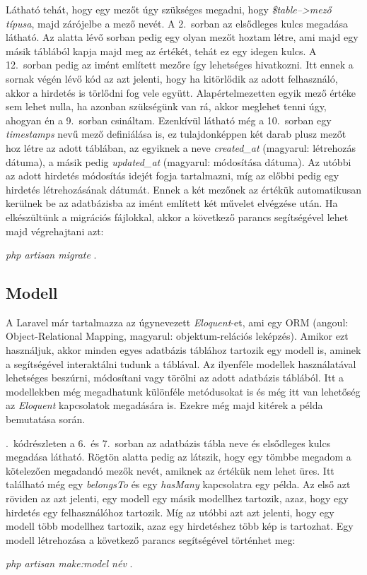 \documentclass[]{thesis-ekf}
\theoremstyle{definition}
\theoremstyle{remark}
\begin{document}
		Látható tehát, hogy egy mezőt úgy szükséges megadni, hogy \emph{\$table-->mező típusa}, majd zárójelbe a mező nevét. A 2.~sorban az elsődleges kulcs megadása látható. Az alatta lévő sorban pedig egy olyan mezőt hoztam létre, ami majd egy másik táblából kapja majd meg az értékét, tehát ez egy idegen kulcs. A 12.~sorban pedig az imént említett mezőre így lehetséges hivatkozni. Itt ennek a sornak végén lévő kód az azt jelenti, hogy ha kitörlődik az adott felhasználó, akkor a hirdetés is törlődni fog vele együtt. Alapértelmezetten egyik mező értéke sem lehet nulla, ha azonban szükségünk van rá, akkor meglehet tenni úgy, ahogyan én a 9.~sorban csináltam. Ezenkívül látható még a 10.~sorban egy \emph{timestamps} nevű mező definiálása is, ez tulajdonképpen két darab plusz mezőt hoz létre az adott táblában, az egyiknek a neve \emph{created\_at} (magyarul: létrehozás dátuma), a másik pedig \emph{updated\_at} (magyarul: módosítása dátuma). Az utóbbi az adott hirdetés módosítás idejét fogja tartalmazni, míg az előbbi pedig egy hirdetés létrehozásának dátumát. Ennek a két mezőnek az értékük automatikusan kerülnek be az adatbázisba az imént említett két művelet elvégzése után. Ha elkészültünk a migrációs fájlokkal, akkor a következő parancs segítségével lehet majd végrehajtani azt:
		\begin{center}
			\emph{php artisan migrate} .
		\end{center}
	\subsection{Modell}
		A Laravel már tartalmazza az úgynevezett \emph{Eloquent}-et, ami egy ORM (angoul: Object-Relational Mapping, magyarul: objektum-relációs leképzés). Amikor ezt használjuk, akkor minden egyes adatbázis táblához tartozik egy modell is, aminek a segítségével interaktálni tudunk a táblával. Az ilyenféle modellek használatával lehetséges beszúrni, módosítani vagy törölni az adott adatbázis táblából. Itt a modellekben még megadhatunk különféle metódusokat is és még itt van lehetőség az \emph{Eloquent} kapcsolatok megadására is. Ezekre még majd kitérek a példa bemutatása során.\cite{Laravel}
		
		
		
		.~kódrészleten a 6.~és 7.~sorban az adatbázis tábla neve és elsődleges kulcs megadása látható. Rögtön alatta pedig az látszik, hogy egy tömbbe megadom a kötelezően megadandó mezők nevét, amiknek az értékük nem lehet üres. Itt található még egy \emph{belongsTo} és egy \emph{hasMany} kapcsolatra egy példa. Az első azt röviden az azt jelenti, egy modell egy másik modellhez tartozik, azaz, hogy egy hirdetés egy felhasználóhoz tartozik. Míg az utóbbi azt azt jelenti, hogy egy modell több modellhez tartozik, azaz egy hirdetéshez több kép is tartozhat. Egy modell létrehozása a következő parancs segítségével történhet meg:
		\begin{center} 
			\emph{php artisan make:model név} .
		\end{center}
	
\end{document}
